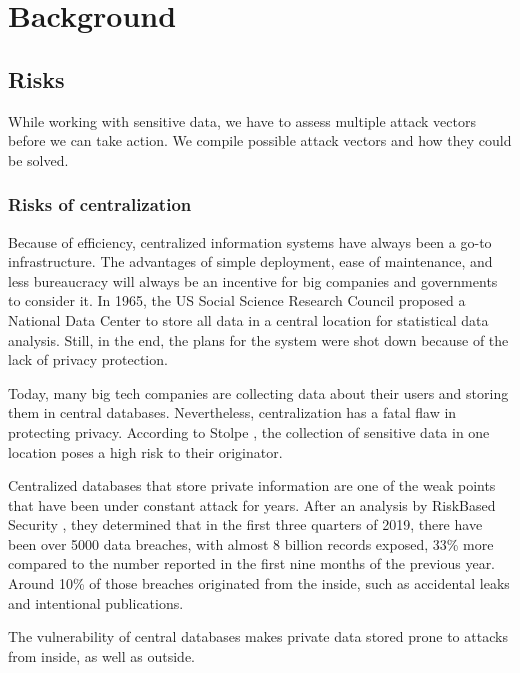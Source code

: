 
\chapter{Background}\label{chapter:relatedwork}
\section{Risks}
While working with sensitive data, we have to assess multiple attack vectors before we can take action. We compile possible attack vectors and how they could be solved.

\subsection{Risks of centralization}
Because of efficiency, centralized information systems have always been a go-to infrastructure. The advantages of simple deployment, ease of maintenance, and less bureaucracy will always be an incentive for big companies and governments to consider it. In 1965, the US Social Science Research Council \cite{lawreview} proposed a National Data Center to store all data in a central location for statistical data analysis. Still, in the end, the plans for the system were shot down because of the lack of privacy protection.

Today, many big tech companies are collecting data about their users and storing them in central databases. Nevertheless, centralization has a fatal flaw in protecting privacy. According to Stolpe \cite{DBLP:journals/sigkdd/Stolpe16}, the collection of sensitive data in one location poses a high risk to their originator.

Centralized databases that store private information are one of the weak points that have been under constant attack for years. After an analysis by RiskBased Security \cite{riskbasedsecurity}, they determined that in the first three quarters of 2019, there have been over 5000 data breaches, with almost 8 billion records exposed, 33\% more compared to the number reported in the first nine months of the previous year. Around 10\% of those breaches originated from the inside, such as accidental leaks and intentional publications.

The vulnerability of central databases makes private data stored prone to attacks from inside, as well as outside.

